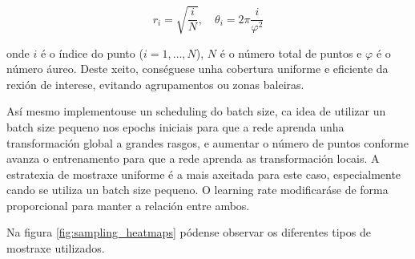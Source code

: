 \[
r_i = \sqrt{\frac{i}{N}}, \quad \theta_i = 2\pi \frac{i}{\varphi^2}
\]

onde $i$ é o índice do punto ($i = 1, \dots, N$), $N$ é o número total de puntos e $\varphi$ é o número áureo. 
Deste xeito, conséguese unha cobertura uniforme e eficiente da rexión de interese, evitando agrupamentos ou zonas baleiras.

Así mesmo implementouse un scheduling do batch size, ca idea de utilizar un batch size pequeno nos epochs iniciais para que a rede aprenda unha transformación global a grandes rasgos, e aumentar o número de puntos conforme avanza o entrenamento para que a rede aprenda as transformación locais.
A estratexia de mostraxe uniforme é a mais axeitada para este caso, especialmente cando se utiliza un batch size pequeno.
O learning rate modificaráse de forma proporcional para manter a relación entre ambos.

Na figura \ref{fig:sampling_heatmaps} pódense observar os diferentes tipos de mostraxe utilizados.

